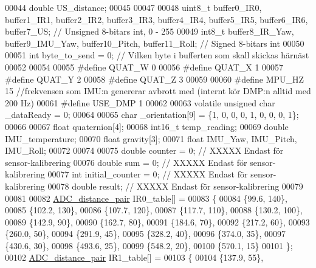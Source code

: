 \begin{DoxyCode}
00044 \textcolor{keywordtype}{double} US\_distance;
00045 
00047 
00048 uint8\_t buffer0\_IR0, buffer1\_IR1, buffer2\_IR2, buffer3\_IR3, buffer4\_IR4, buffer5\_IR5, buffer6\_IR6, 
      buffer7\_US;      \textcolor{comment}{// Unsigned 8-bitars int, 0 - 255}
00049 int8\_t buffer8\_IR\_Yaw, buffer9\_IMU\_Yaw, buffer10\_Pitch, buffer11\_Roll;      \textcolor{comment}{// Signed 8-bitars int}
00050 
00051 \textcolor{keywordtype}{int} byte\_to\_send = 0;           \textcolor{comment}{// Vilken byte i bufferten som skall skickas härnäst}
00052 
00054 
00055 \textcolor{preprocessor}{#define QUAT\_W 0}
00056 \textcolor{preprocessor}{#define QUAT\_X 1}
00057 \textcolor{preprocessor}{#define QUAT\_Y 2}
00058 \textcolor{preprocessor}{#define QUAT\_Z 3}
00059 
00060 \textcolor{preprocessor}{#define MPU\_HZ 15       //frekvensen som IMU:n genererar avbrott med (internt kör DMP:n alltid med 200 Hz)}
00061 \textcolor{preprocessor}{#define USE\_DMP 1}
00062 
00063 \textcolor{keyword}{volatile} \textcolor{keywordtype}{unsigned} \textcolor{keywordtype}{char} \_dataReady = 0;
00064 
00065 \textcolor{keywordtype}{char} \_orientation[9] = \{1, 0, 0,  0, 1, 0,  0, 0, 1\};
00066 
00067 \textcolor{keywordtype}{float} quaternion[4];
00068 int16\_t temp\_reading;
00069 \textcolor{keywordtype}{double} IMU\_temperature;
00070 \textcolor{keywordtype}{float} gravity[3];
00071 \textcolor{keywordtype}{float} IMU\_Yaw, IMU\_Pitch, IMU\_Roll;
00072 
00074 
00075 \textcolor{keywordtype}{double} counter = 0;             \textcolor{comment}{// XXXXX Endast för sensor-kalibrering}
00076 \textcolor{keywordtype}{double} sum = 0;                 \textcolor{comment}{// XXXXX Endast för sensor-kalibrering}
00077 \textcolor{keywordtype}{int} initial\_counter = 0;        \textcolor{comment}{// XXXXX Endast för sensor-kalibrering}
00078 \textcolor{keywordtype}{double} result;                  \textcolor{comment}{// XXXXX Endast för sensor-kalibrering}
00079 
00081 
00082 \hyperlink{struct_a_d_c__distance__pair}{ADC\_distance\_pair} IR0\_table[] =
00083 \{
00084     \{99.6, 140\},
00085     \{102.2, 130\},
00086     \{107.7, 120\},
00087     \{117.7, 110\},
00088     \{130.2, 100\},
00089     \{142.9, 90\},
00090     \{162.7, 80\},
00091     \{184.6, 70\},
00092     \{217.2, 60\},
00093     \{260.0, 50\},
00094     \{291.9, 45\},
00095     \{328.2, 40\},
00096     \{374.0, 35\},
00097     \{430.6, 30\},
00098     \{493.6, 25\},
00099     \{548.2, 20\},
00100     \{570.1, 15\}
00101 \};
00102 \hyperlink{struct_a_d_c__distance__pair}{ADC\_distance\_pair} IR1\_table[] =
00103 \{
00104     \{137.9, 55\},

\end{DoxyCode}
